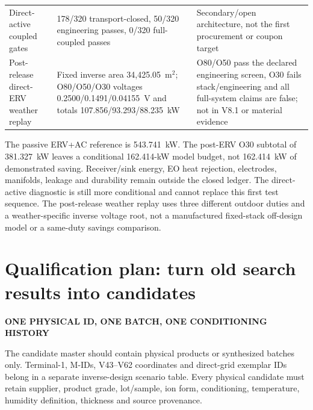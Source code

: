 \documentclass[10pt,a4paper]{article}
\newcommand{\eyebrow}[1]{{\sffamily\bfseries\small\color{Teal}\MakeUppercase{#1}}}
\begin{document}
\begin{center}
\begin{tabularx}{\textwidth}{@{}p{31mm}p{42mm}Y@{}}
Direct-active coupled gates & 178/320 transport-closed, 50/320 engineering passes, 0/320 full-coupled passes & Secondary/open architecture, not the first procurement or coupon target \\
Post-release direct-ERV weather replay & Fixed inverse area 34,425.05~m$^2$; O80/O50/O30 voltages 0.2500/0.1491/0.04155~V and totals 107.856/93.293/88.235~kW & O80/O50 pass the declared engineering screen, O30 fails stack/engineering and all full-system claims are false; not in V8.1 or material evidence \\
\bottomrule
\end{tabularx}
\end{center}

The passive ERV+AC reference is 543.741~kW. The post-ERV O30 subtotal of
381.327~kW leaves a conditional 162.414-kW model budget, not 162.414~kW of
demonstrated saving. Receiver/sink energy, EO heat rejection, electrodes,
manifolds, leakage and durability remain outside the closed ledger. The
direct-active diagnostic is still more conditional and cannot replace this
first test sequence. The post-release weather replay uses three different
outdoor duties and a weather-specific inverse voltage root, not a manufactured
fixed-stack off-design model or a same-duty savings comparison.

\section{Qualification plan: turn old search results into candidates}
\eyebrow{One physical ID, one batch, one conditioning history}

The candidate master should contain physical products or synthesized batches
only. Terminal-1, M-IDs, V43--V62 coordinates and direct-grid exemplar IDs
belong in a separate inverse-design scenario table. Every physical candidate
must retain supplier, product grade, lot/sample, ion form, conditioning,
temperature, humidity definition, thickness and source provenance.
\end{document}
